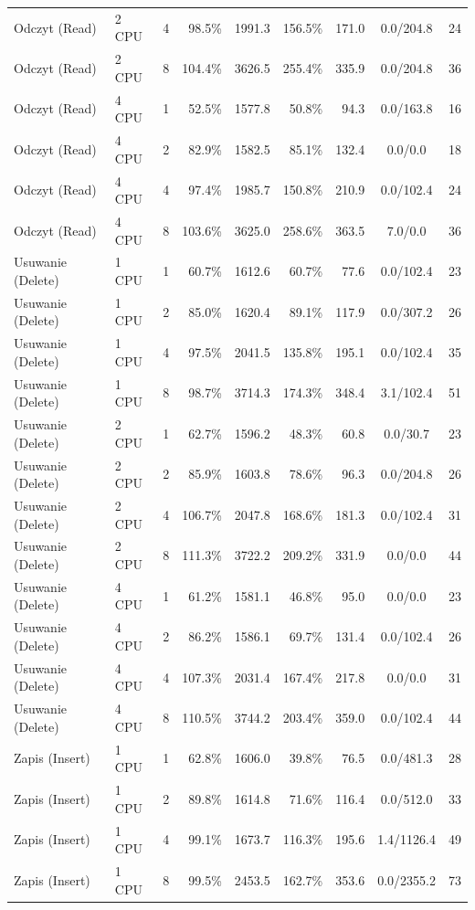 \begin{table}[ht]
{\begin{tabular}{llcrrrrcc}
Odczyt (Read) & 2 CPU & 4 & 98.5\% & 1991.3 & 156.5\% & 171.0 & 0.0/204.8 & 24 \\
Odczyt (Read) & 2 CPU & 8 & 104.4\% & 3626.5 & 255.4\% & 335.9 & 0.0/204.8 & 36 \\
Odczyt (Read) & 4 CPU & 1 & 52.5\% & 1577.8 & 50.8\% & 94.3 & 0.0/163.8 & 16 \\
Odczyt (Read) & 4 CPU & 2 & 82.9\% & 1582.5 & 85.1\% & 132.4 & 0.0/0.0 & 18 \\
Odczyt (Read) & 4 CPU & 4 & 97.4\% & 1985.7 & 150.8\% & 210.9 & 0.0/102.4 & 24 \\
Odczyt (Read) & 4 CPU & 8 & 103.6\% & 3625.0 & 258.6\% & 363.5 & 7.0/0.0 & 36 \\
Usuwanie (Delete) & 1 CPU & 1 & 60.7\% & 1612.6 & 60.7\% & 77.6 & 0.0/102.4 & 23 \\
Usuwanie (Delete) & 1 CPU & 2 & 85.0\% & 1620.4 & 89.1\% & 117.9 & 0.0/307.2 & 26 \\
Usuwanie (Delete) & 1 CPU & 4 & 97.5\% & 2041.5 & 135.8\% & 195.1 & 0.0/102.4 & 35 \\
Usuwanie (Delete) & 1 CPU & 8 & 98.7\% & 3714.3 & 174.3\% & 348.4 & 3.1/102.4 & 51 \\
Usuwanie (Delete) & 2 CPU & 1 & 62.7\% & 1596.2 & 48.3\% & 60.8 & 0.0/30.7 & 23 \\
Usuwanie (Delete) & 2 CPU & 2 & 85.9\% & 1603.8 & 78.6\% & 96.3 & 0.0/204.8 & 26 \\
Usuwanie (Delete) & 2 CPU & 4 & 106.7\% & 2047.8 & 168.6\% & 181.3 & 0.0/102.4 & 31 \\
Usuwanie (Delete) & 2 CPU & 8 & 111.3\% & 3722.2 & 209.2\% & 331.9 & 0.0/0.0 & 44 \\
Usuwanie (Delete) & 4 CPU & 1 & 61.2\% & 1581.1 & 46.8\% & 95.0 & 0.0/0.0 & 23 \\
Usuwanie (Delete) & 4 CPU & 2 & 86.2\% & 1586.1 & 69.7\% & 131.4 & 0.0/102.4 & 26 \\
Usuwanie (Delete) & 4 CPU & 4 & 107.3\% & 2031.4 & 167.4\% & 217.8 & 0.0/0.0 & 31 \\
Usuwanie (Delete) & 4 CPU & 8 & 110.5\% & 3744.2 & 203.4\% & 359.0 & 0.0/102.4 & 44 \\
Zapis (Insert) & 1 CPU & 1 & 62.8\% & 1606.0 & 39.8\% & 76.5 & 0.0/481.3 & 28 \\
Zapis (Insert) & 1 CPU & 2 & 89.8\% & 1614.8 & 71.6\% & 116.4 & 0.0/512.0 & 33 \\
Zapis (Insert) & 1 CPU & 4 & 99.1\% & 1673.7 & 116.3\% & 195.6 & 1.4/1126.4 & 49 \\
Zapis (Insert) & 1 CPU & 8 & 99.5\% & 2453.5 & 162.7\% & 353.6 & 0.0/2355.2 & 73 \\

\end{tabular}}
\end{table}
